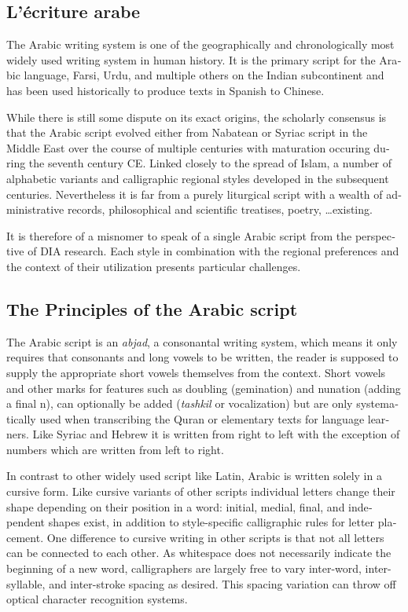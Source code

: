 \begin{french}
\section{L'écriture arabe}

The Arabic writing system is one of the geographically and chronologically most
widely used writing system in human history. It is the primary script for the
Arabic language, Farsi, Urdu, and multiple others on the Indian subcontinent
and has been used historically to produce texts in Spanish to Chinese.

While there is still some dispute on its exact origins, the scholarly consensus
is that the Arabic script evolved either from Nabatean or Syriac script in the
Middle East over the course of multiple centuries with maturation occuring
during the seventh century CE.  Linked closely to the spread of Islam, a number
of alphabetic variants and calligraphic regional styles developed in the
subsequent centuries. Nevertheless it is far from a purely liturgical script
with a wealth of administrative records, philosophical and scientific
treatises, poetry, \dots existing.

It is therefore of a misnomer to speak of a single Arabic script from the
perspective of DIA research. Each style in combination with the regional
preferences and the context of their utilization presents particular
challenges.

\subsection{The Principles of the Arabic script}

The Arabic script is an \emph{abjad}, a consonantal writing system, which means
it only requires that consonants and long vowels to be written, the reader is
supposed to supply the appropriate short vowels themselves from the context.
Short vowels and other marks for features such as doubling (gemination) and
nunation (adding a final n), can optionally be added (\emph{tashkil} or
vocalization) but are only systematically used when transcribing the Quran or
elementary texts for language learners. Like Syriac and Hebrew it is written
from right to left with the exception of numbers which are written from left to
right. 

In contrast to other widely used script like Latin, Arabic is written solely in
a cursive form. Like cursive variants of other scripts individual letters
change their shape depending on their position in a word: initial, medial,
final, and independent shapes exist, in addition to style-specific calligraphic
rules for letter placement. One difference to cursive writing in other scripts
is that not all letters can be connected to each other. As whitespace does not
necessarily indicate the beginning of a new word, calligraphers are largely
free to vary inter-word, inter-syllable, and inter-stroke spacing as desired.
This spacing variation can throw off optical character recognition systems.


\end{french}

